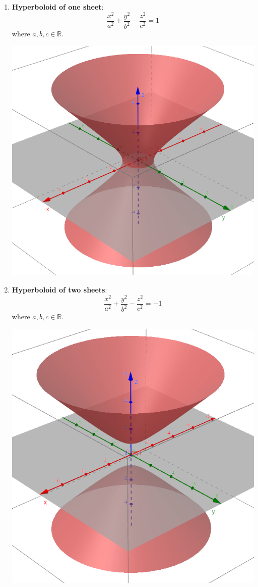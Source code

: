 \documentclass[12pt]{article}
\begin{document}
\begin{enumerate}
\newpage
\item \textbf{Hyperboloid of one sheet}: $$\frac{x^2}{a^2}+\frac{y^2}{b^2}-\frac{z^2}{c^2}=1$$ where $a,b,c \in \mathbb{R}$.

\includegraphics[scale=0.74]{hy_1.png}

\newpage
\item \textbf{Hyperboloid of two sheets}: $$\frac{x^2}{a^2}+\frac{y^2}{b^2}-\frac{z^2}{c^2}=-1$$ where $a,b,c \in \mathbb{R}$.

\includegraphics[scale=0.75]{hy_2.png}


\end{enumerate}
\end{document}

